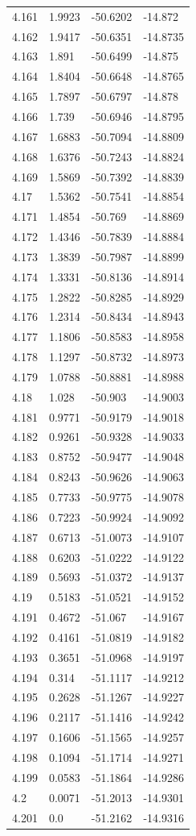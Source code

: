 \begin{tabular}{llll}
4.161 & 1.9923 & -50.6202 & -14.872 \\
4.162 & 1.9417 & -50.6351 & -14.8735 \\
4.163 & 1.891 & -50.6499 & -14.875 \\
4.164 & 1.8404 & -50.6648 & -14.8765 \\
4.165 & 1.7897 & -50.6797 & -14.878 \\
4.166 & 1.739 & -50.6946 & -14.8795 \\
4.167 & 1.6883 & -50.7094 & -14.8809 \\
4.168 & 1.6376 & -50.7243 & -14.8824 \\
4.169 & 1.5869 & -50.7392 & -14.8839 \\
4.17 & 1.5362 & -50.7541 & -14.8854 \\
4.171 & 1.4854 & -50.769 & -14.8869 \\
4.172 & 1.4346 & -50.7839 & -14.8884 \\
4.173 & 1.3839 & -50.7987 & -14.8899 \\
4.174 & 1.3331 & -50.8136 & -14.8914 \\
4.175 & 1.2822 & -50.8285 & -14.8929 \\
4.176 & 1.2314 & -50.8434 & -14.8943 \\
4.177 & 1.1806 & -50.8583 & -14.8958 \\
4.178 & 1.1297 & -50.8732 & -14.8973 \\
4.179 & 1.0788 & -50.8881 & -14.8988 \\
4.18 & 1.028 & -50.903 & -14.9003 \\
4.181 & 0.9771 & -50.9179 & -14.9018 \\
4.182 & 0.9261 & -50.9328 & -14.9033 \\
4.183 & 0.8752 & -50.9477 & -14.9048 \\
4.184 & 0.8243 & -50.9626 & -14.9063 \\
4.185 & 0.7733 & -50.9775 & -14.9078 \\
4.186 & 0.7223 & -50.9924 & -14.9092 \\
4.187 & 0.6713 & -51.0073 & -14.9107 \\
4.188 & 0.6203 & -51.0222 & -14.9122 \\
4.189 & 0.5693 & -51.0372 & -14.9137 \\
4.19 & 0.5183 & -51.0521 & -14.9152 \\
4.191 & 0.4672 & -51.067 & -14.9167 \\
4.192 & 0.4161 & -51.0819 & -14.9182 \\
4.193 & 0.3651 & -51.0968 & -14.9197 \\
4.194 & 0.314 & -51.1117 & -14.9212 \\
4.195 & 0.2628 & -51.1267 & -14.9227 \\
4.196 & 0.2117 & -51.1416 & -14.9242 \\
4.197 & 0.1606 & -51.1565 & -14.9257 \\
4.198 & 0.1094 & -51.1714 & -14.9271 \\
4.199 & 0.0583 & -51.1864 & -14.9286 \\
4.2 & 0.0071 & -51.2013 & -14.9301 \\
4.201 & 0.0 & -51.2162 & -14.9316 \\
\bottomrule
\end{tabular}
